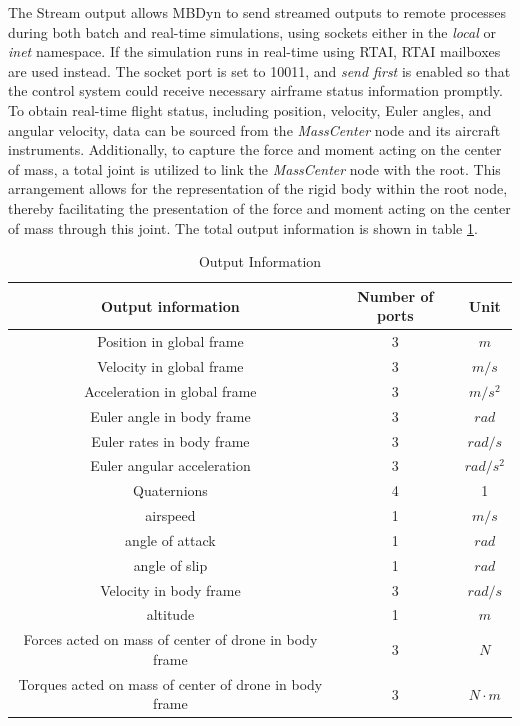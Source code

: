 The Stream output allows MBDyn to send streamed outputs to remote processes during both batch and real-time simulations, using sockets either in the \textit{local} or \textit{inet} namespace. If the simulation runs in real-time using RTAI, RTAI mailboxes are used instead. The socket port is set to 10011, and \textit{send first} is enabled so that the control system could receive necessary airframe status information promptly. To obtain real-time flight status, including position, velocity, Euler angles, and angular velocity, data can be sourced from the \textit{MassCenter} node and its aircraft instruments. Additionally, to capture the force and moment acting on the center of mass, a total joint is utilized to link the \textit{MassCenter} node with the root. This arrangement allows for the representation of the rigid body within the root node, thereby facilitating the presentation of the force and moment acting on the center of mass through this joint. The total output information is shown in table \ref{tab:output element}.

\begin{table}
    \centering
    \begin{tabular}{ccc}
    \hline
        Output information & Number of ports & Unit\\
    \hline
        Position in global frame & 3 & $m$ \\
        Velocity in global frame & 3 & $m/s$ \\
        Acceleration in global frame & 3 & $m/s^2$ \\
        Euler angle in body frame & 3 & $rad$ \\
        Euler rates in body frame & 3 & $rad/s$ \\
        Euler angular acceleration & 3 & $rad/s^2$ \\
        Quaternions & 4 & 1 \\
        airspeed & 1 & $m/s$ \\
        angle of attack & 1 & $rad$ \\
        angle of slip & 1  & $rad$ \\
        Velocity in body frame & 3  & $rad/s$ \\
        altitude & 1 & $m$ \\
        Forces acted on mass of center of drone in body frame & 3 & $N$ \\
        Torques acted on mass of center of drone in body frame & 3 & $N \cdot m$ \\
    \hline
    \end{tabular}
    \caption{Output Information}
    \label{tab:output element}
\end{table}

